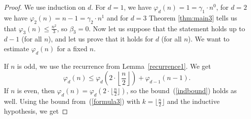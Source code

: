 \documentclass[10pt,a4paper]{amsart}
\begin{document}
\begin{proof}
    We use induction on $d$. For $d=1$, we have $\varphi_d(n)=1=\gamma_1\cdot n^0$, for $d=2$ we have $\varphi_2(n)=n-1=\gamma_2\cdot n^1$ and for $d=3$ Theorem \ref{thm:main3} %
    tells us that $\varphi_3(n) \leq \frac{n^2}{3}$, so $\beta_3=0$. Now let us suppose that the statement holds up to $d-1$ (for all $n$), and let us prove that it holds for $d$ (for all $n$). We want to estimate $\varphi_d(n)$ for a fixed $n$.

    If $n$ is odd, we use the recurrence from Lemma~\ref{recurrence1}. We get
    \begin{equation}\label{indbound}
        \varphi_d(n)\leq %
        \varphi_d\left(2\cdot \left\lfloor \frac{n}{2} \right\rfloor \right)+\varphi_{d-1}(n-1).
    \end{equation}
    If $n$ is even, then $\varphi_d(n)=\varphi_d\left(2\cdot \lfloor \frac{n}{2} \rfloor \right)$, so the bound~(\ref{indbound}) holds as well. Using the bound from~(\ref{formula3}) with $k= \lfloor \frac{n}{2} \rfloor$ and the  inductive hypothesis, we get


\end{proof}
\end{document}
